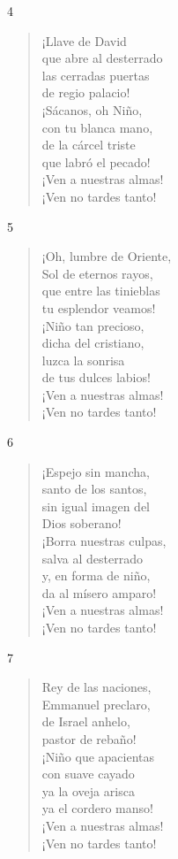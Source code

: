 \documentclass[spanish,utf8,twocolumn]{chlart}
\newenvironment{gozo}{\begin{verse}\color{lector}}{\end{verse}}
\newcommand*\vena{{\color{responden}\hspace{1em}¡Ven a nuestras almas!\\\hspace{1em}¡Ven no tardes tanto!}}
\begin{document}
4
\begin{gozo}
¡Llave de David\\
que abre al desterrado\\
las cerradas puertas\\
de regio palacio!\\
¡Sácanos, oh Niño,\\
con tu blanca mano,\\
de la cárcel triste\\
que labró el pecado!\\
\vena
\end{gozo}

5
\begin{gozo}
¡Oh, lumbre de Oriente,\\
Sol de eternos rayos,\\
que entre las tinieblas\\
tu esplendor veamos!\\
¡Niño tan precioso,\\
dicha del cristiano,\\
luzca la sonrisa\\
de tus dulces labios!\\
\vena
\end{gozo}

6
\begin{gozo}
¡Espejo sin mancha,\\
santo de los santos,\\
sin igual imagen del\\
Dios soberano!\\
¡Borra nuestras culpas,\\
salva al desterrado\\
y, en forma de niño,\\
da al mísero amparo!\\
\vena
\end{gozo}

7
\begin{gozo}
Rey de las naciones,\\
Emmanuel preclaro,\\
de Israel anhelo,\\
pastor de rebaño!\\
¡Niño que apacientas\\
con suave cayado\\
ya la oveja arisca\\
ya el cordero manso!\\
\vena
\end{gozo}
\end{document}
